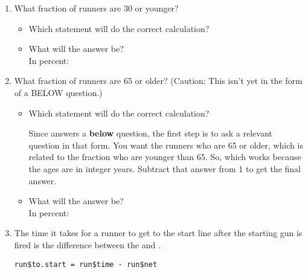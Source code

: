\begin{enumerate}
\bigskip

\item What fraction of runners are 30 or younger?\\
\begin{itemize}
\item Which statement will do the correct calculation?
\begin{MultipleChoice}

\end{MultipleChoice}

\item What will the answer be?  \\
In percent:  
\end{itemize}

\bigskip

\item What fraction of runners are 65 or older?  (Caution: This isn't
  yet in the form of a BELOW question.)
\begin{itemize}
\item Which statement will do the correct calculation?
\begin{MultipleChoice}
\end{MultipleChoice}

\begin{AnswerText}
Since  answers a {\bf below} question, the first step is
to ask a relevant question in that form.  You want the runners who are
65 or older, which is related to the fraction who are younger than
65.  So,   %
which works because the ages
are in integer years.  Subtract that answer from 1 to get the final answer.


\end{AnswerText}


\item What will the answer be?\\
In percent:  
\end{itemize}

\item The time it takes for a runner to get to the start line after
  the starting gun is fired is
  the difference between the  and . 
\begin{verbatim}
run$to.start = run$time - run$net
\end{verbatim}


\end{enumerate}
